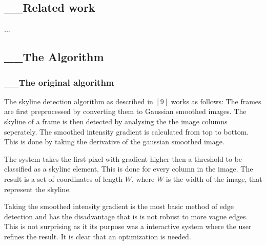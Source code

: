 \documentclass[10pt]{article}
\begin{document}
 \subsection{__Related work}
 ...


 \subsection{__The Algorithm}
 \subsubsection{__The original algorithm}
The skyline detection algorithm as described in $[9]$ works as follows:
The frames are first preprocessed by converting them to Gaussian smoothed images.
The skyline of a frame is then detected by analysing the the image columns
seperately.
The smoothed intensity gradient is calculated from top to bottom. This is done
by taking the derivative of the gaussian smoothed image.

The system takes the first pixel with gradient higher then a threshold to be
classified as a skyline element.  This is done for every column in the image.
The result is a set of coordinates of length $W$,
where $W$ is the width of the image, that represent the skyline.

Taking the smoothed intensity gradient is the most basic method of edge
detection and has the disadvantage that is is not robust to more vague
edges. This is not surprising as it its purpose was a interactive system where the
user refines the result. It is clear that an optimization is needed.
\end{document}
